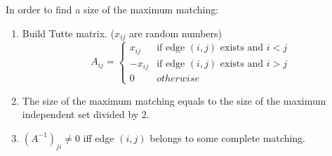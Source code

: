 In order to find a size of the maximum matching:
\begin{enumerate}
	\item Build Tutte matrix. ($x_{ij}$ are random numbers)
	$$A_{ij} = 
	\begin{cases} 
	x_{ij} & \text{if edge $(i, j)$ exists and $i < j$} \\
	-x_{ij} & \text{if edge $(i, j)$ exists and $i > j$} \\
	0 & otherwise
	\end{cases}$$
	\item The size of the maximum matching equals to the size of the maximum independent set divided by $2$.
	\item $(A^{-1})_{ji} \neq 0$ iff edge $(i, j)$ belongs to some complete matching.
\end{enumerate}